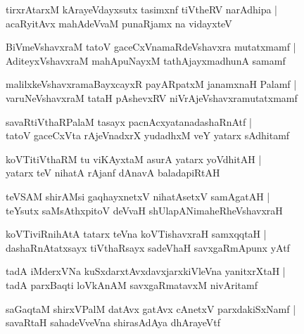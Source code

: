 \documentclass[twoside,12pt,openright]{book}
\newcounter{shloka}[chapter]
\begin{document}
\begin{shloka}
tirxrAtarxM kArayeVdayxsutx tasimxnf tiVtheRV narAdhipa |\\
acaRyitAvx mahAdeVvaM punaRjamx na vidayxteV 
\end{shloka}

\begin{shloka}
BiVmeVshavxraM tatoV gaceCxVnamaRdeVshavxra mutatxmamf |\\
AditeyxVshavxraM mahApuNayxM tathAjayxmadhunA samamf 
\end{shloka}

\begin{shloka}
malilxkeVshavxramaBayxcayxR payARpatxM janamxnaH Palamf |\\
varuNeVshavxraM tataH pAshevxRV niVrAjeVshavxramutatxmamf 
\end{shloka}

\begin{shloka}
savaRtiVthaRPalaM tasayx pacnAcxyatanadashaRnAtf |\\
tatoV gaceCxVta rAjeVnadxrX yudadhxM veY yatarx sAdhitamf 
\end{shloka}

\begin{shloka}
koVTitiVthaRM tu viKAyxtaM asurA yatarx yoVdhitAH |\\
yatarx teV nihatA rAjanf dAnavA baladapiRtAH 
\end{shloka}

\begin{shloka}
teVSAM shirAMsi gaqhayxnetxV nihatAsetxV samAgatAH |\\
teYsutx saMsAthxpitoV deVvaH shUlapANimaheRheVshavxraH
\end{shloka}

\begin{shloka}
koVTiviRnihAtA tatarx teVna koVTishavxraH samxqqtaH |\\
dashaRnAtatxsayx tiVthaRsayx sadeVhaH savxgaRmApunx yAtf
\end{shloka}

\begin{shloka}
tadA iMderxVNa kuSxdarxtAvxdavxjarxkiVleVna yanitxrXtaH  |\\
tadA parxBaqti loVkAnAM savxgaRmatavxM nivAritamf 
\end{shloka}

\begin{shloka}
saGaqtaM shirxVPalM datAvx gatAvx cAnetxV parxdakiSxNamf |\\
savaRtaH sahadeVveVna shirasAdAya dhArayeVtf
\end{shloka}
\end{document}
